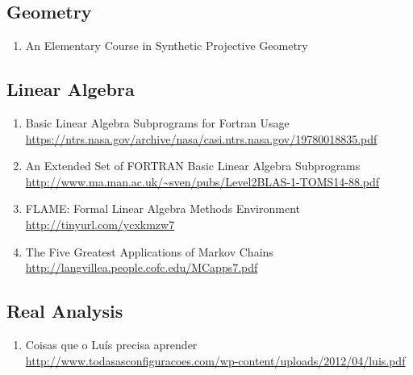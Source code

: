 \documentclass{article}
\begin{document}
\subsection{Geometry}
\begin{enumerate}
	\item {An Elementary Course in Synthetic Projective Geometry}
\end{enumerate}

\subsection{Linear Algebra}
\begin{enumerate}
	\item {Basic Linear Algebra Subprograms for Fortran Usage\\
\url{https://ntrs.nasa.gov/archive/nasa/casi.ntrs.nasa.gov/19780018835.pdf}}
\item {An Extended Set of FORTRAN Basic Linear Algebra Subprograms\\\url{http://www.ma.man.ac.uk/~sven/pubs/Level2BLAS-1-TOMS14-88.pdf}}
	\item{FLAME: Formal Linear Algebra Methods Environment\\
\url{http://tinyurl.com/ycxkmzw7}}
	\item{The Five Greatest Applications of Markov Chains\\
\url{http://langvillea.people.cofc.edu/MCapps7.pdf}}
\end{enumerate}

\subsection{Real Analysis}
\begin{enumerate}
	\item {Coisas que o Luís precisa aprender\\
\url{http://www.todasasconfiguracoes.com/wp-content/uploads/2012/04/luis.pdf}}
\end{enumerate}
\end{document}
